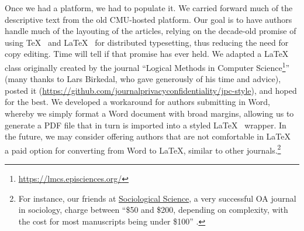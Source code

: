\documentclass{jpcfinal} %
\newcommand{\urlcite}[2]{#2\footnote{\url{#1}}}
\begin{document}
Once we had a platform, we had to populate it. We carried forward much of the descriptive text from the old CMU-hosted platform. Our goal is to have authors handle much of the layouting of the articles, relying on the decade-old promise of using \TeX~ \citep{Knuth1986} and \LaTeX~ \citep{Lamport1986} for distributed typesetting, thus reducing the need for copy editing. Time will tell if that promise has ever held. We adapted a \LaTeX~ class originally created by the journal ``\urlcite{https://lmcs.episciences.org/}{Logical Methods in Computer Science}'' (many thanks to Lars Birkedal, who gave generously of his time and advice), posted it (\url{https://github.com/journalprivacyconfidentiality/jpc-style}), and hoped for the best. We developed a workaround for authors submitting in Word, whereby we simply format a Word document with broad margins, allowing us to generate a PDF file that in turn is imported into a styled \LaTeX~ wrapper. In the future, we may consider offering authors that are not comfortable in \LaTeX~ a paid option for converting from Word to \LaTeX, similar to other journals.\footnote{For instance, our friends at \href{https://www.sociologicalscience.com/}{Sociological Science}, a very successful OA journal in sociology, charge between  ``\$50 and \$200, depending on complexity, with the cost for most manuscripts being under \$100'' \citep{SociologicalScience2018}. }
\end{document}
